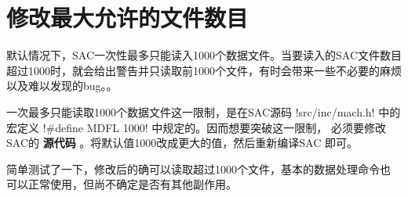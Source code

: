 \section{修改最大允许的文件数目}
\label{sec:mdfl}
默认情况下，SAC一次性最多只能读入1000个数据文件。当要读入的SAC文件数目
超过1000时，就会给出警告并只读取前1000个文件，有时会带来一些不必要的麻烦
以及难以发现的bug。。

一次最多只能读取1000个数据文件这一限制，是在SAC源码 !src/inc/mach.h!
中的宏定义 !#define MDFL 1000! 中规定的。因而想要突破这一限制，
必须要修改SAC的 \textbf{源代码} 。将默认值1000改成更大的值，然后重新编译SAC
即可。

简单测试了一下，修改后的确可以读取超过1000个文件，基本的数据处理命令也
可以正常使用，但尚不确定是否有其他副作用。
